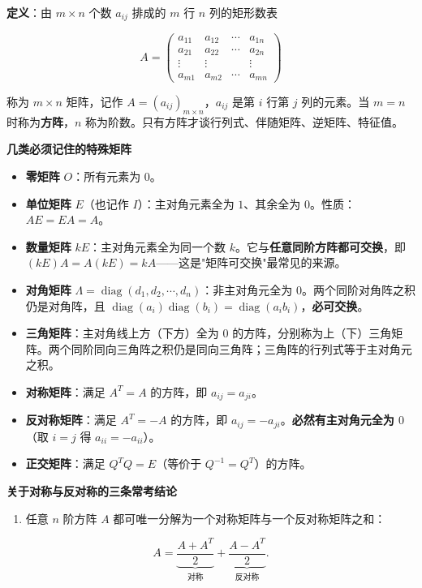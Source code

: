 \documentclass[11pt,openany,UTF8]{ctexbook}
\begin{document}
\textbf{定义}：由 $m\times n$ 个数 $a_{ij}$ 排成的 $m$ 行 $n$ 列的矩形数表

\[A=\begin{pmatrix}a_{11}&a_{12}&\cdots&a_{1n}\\a_{21}&a_{22}&\cdots&a_{2n}\\\vdots&\vdots&&\vdots\\a_{m1}&a_{m2}&\cdots&a_{mn}\end{pmatrix}\]

称为 $m\times n$ 矩阵，记作 $A=(a_{ij})_{m\times n}$，$a_{ij}$ 是第 $i$ 行第 $j$ 列的元素。当 $m=n$ 时称为\textbf{方阵}，$n$ 称为阶数。只有方阵才谈行列式、伴随矩阵、逆矩阵、特征值。

\textbf{几类必须记住的特殊矩阵}

\begin{itemize}
\item \textbf{零矩阵} $O$：所有元素为 $0$。
\item \textbf{单位矩阵} $E$（也记作 $I$）：主对角元素全为 $1$、其余全为 $0$。性质：$AE=EA=A$。
\item \textbf{数量矩阵} $kE$：主对角元素全为同一个数 $k$。它与\textbf{任意同阶方阵都可交换}，即 $(kE)A=A(kE)=kA$——这是"矩阵可交换"最常见的来源。
\item \textbf{对角矩阵} $\Lambda=\operatorname{diag}(d_1,d_2,\cdots,d_n)$：非主对角元全为 $0$。两个同阶对角阵之积仍是对角阵，且 $\operatorname{diag}(a_i)\operatorname{diag}(b_i)=\operatorname{diag}(a_ib_i)$，\textbf{必可交换}。
\item \textbf{三角矩阵}：主对角线上方（下方）全为 $0$ 的方阵，分别称为上（下）三角矩阵。两个同阶同向三角阵之积仍是同向三角阵；三角阵的行列式等于主对角元之积。
\item \textbf{对称矩阵}：满足 $A^T=A$ 的方阵，即 $a_{ij}=a_{ji}$。
\item \textbf{反对称矩阵}：满足 $A^T=-A$ 的方阵，即 $a_{ij}=-a_{ji}$。\textbf{必然有主对角元全为 $0$}（取 $i=j$ 得 $a_{ii}=-a_{ii}$）。
\item \textbf{正交矩阵}：满足 $Q^TQ=E$（等价于 $Q^{-1}=Q^T$）的方阵。
\end{itemize}
\textbf{关于对称与反对称的三条常考结论}

\begin{enumerate}
\item 任意 $n$ 阶方阵 $A$ 都可唯一分解为一个对称矩阵与一个反对称矩阵之和：
\end{enumerate}
\[A=\underbrace{\frac{A+A^T}{2}}_{\text{对称}}+\underbrace{\frac{A-A^T}{2}}_{\text{反对称}} .\]
\end{document}
